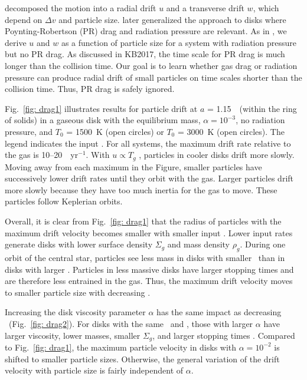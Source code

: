 \documentclass[12pt,preprint]{aastex}
\begin{document}
\citet{weiden1977a} decomposed the motion into a radial drift $u$ and a transverse drift 
$w$, which depend on $\Delta v$ and particle size.  \citet{take2001} later generalized 
the \citet{weiden1977a} approach to disks where Poynting-Robertson (PR) drag and radiation 
pressure are relevant. As in \citet{knb2016}, we derive $u$ and $w$ as a function of particle 
size for a system with radiation pressure but no PR drag. As discussed in KB2017, the time
scale for PR drag is much longer than the collision time. Our goal is to learn
whether gas drag or radiation pressure can produce radial drift of small particles 
on time scales shorter than the collision time. Thus, PR drag is safely ignored.

Fig.~\ref{fig: drag1} illustrates results for particle drift at 
$a$ = 1.15~\rsun\ (within the ring of solids) in a gaseous disk with the equilibrium mass,
$\alpha = 10^{-3}$, no radiation pressure, and $T_0$ = 1500~K (open circles) 
or $T_0$ = 3000~K (open circles).  The legend indicates the input \mdotz. 
For all systems, the maximum drift rate relative to the gas is 
10--20~\rearth\ yr$^{-1}$.  With $u \propto T_g$ \citep{weiden1977a}, 
particles in cooler disks drift more slowly.  Moving away from each maximum 
in the Figure, smaller particles have successively lower drift rates until 
they orbit with the gas. Larger particles drift more slowly because they have 
too much inertia for the gas to move. These particles follow Keplerian orbits. 

Overall, it is clear from Fig.~\ref{fig: drag1} that the radius of particles with
the maximum drift velocity becomes smaller with smaller input \mdotz. Lower input
rates generate disks with lower surface density $\Sigma_g$ and mass density $\rho_g$.
During one orbit of the central star, particles see less mass in disks with smaller 
\mdotz\ than in disks with larger \mdotz. Particles in less massive disks have larger
stopping times and are therefore less entrained in the gas. Thus, the maximum drift 
velocity moves to smaller particle size with decreasing \mdotz.

Increasing the disk viscosity parameter $\alpha$ has the same impact as decreasing
\mdotz\ (Fig.~\ref{fig: drag2}). For disks with the same \mdotz\ and \mdotv, those 
with larger $\alpha$ have larger viscosity, lower masses, smaller $\Sigma_g$, and 
larger stopping times \citep[e.g.,][]{lbp1974,weiden1977a}. Compared to 
Fig.~\ref{fig: drag1}, the maximum particle velocity in disks with $\alpha = 10^{-2}$
is shifted to smaller particle sizes. Otherwise, the general variation of the drift
velocity with particle size is fairly independent of $\alpha$.
\end{document}
